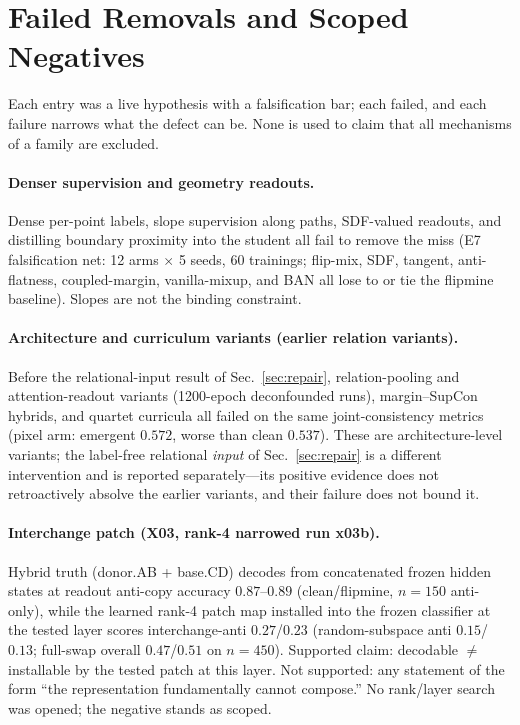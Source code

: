 \section{Failed Removals and Scoped Negatives}
\label{sec:failures}

Each entry was a live hypothesis with a falsification bar; each failed, and
each failure narrows what the defect can be. None is used to claim that all
mechanisms of a family are excluded.

\paragraph{Denser supervision and geometry readouts.} Dense per-point
labels, slope supervision along paths, SDF-valued readouts, and distilling
boundary proximity into the student all fail to remove the miss (E7
falsification net: 12 arms $\times$ 5 seeds, 60 trainings; flip-mix, SDF,
tangent, anti-flatness, coupled-margin, vanilla-mixup, and BAN all lose to
or tie the flipmine baseline). Slopes are not the binding constraint.

\paragraph{Architecture and curriculum variants (earlier relation
variants).} Before the relational-input result of
Sec.~\ref{sec:repair}, relation-pooling and attention-readout variants
(1200-epoch deconfounded runs), margin--SupCon hybrids, and quartet
curricula all failed on the same joint-consistency metrics (pixel arm:
emergent $0.572$, worse than clean $0.537$). These are architecture-level
variants; the label-free relational \emph{input} of
Sec.~\ref{sec:repair} is a different intervention and is reported
separately---its positive evidence does not retroactively absolve the
earlier variants, and their failure does not bound it.

\paragraph{Interchange patch (X03, rank-4 narrowed run x03b).} Hybrid
truth (donor.AB + base.CD) decodes from concatenated frozen hidden states
at readout anti-copy accuracy $0.87$--$0.89$ (clean/flipmine, $n{=}150$
anti-only), while the learned rank-4 patch map installed into the frozen
classifier at the tested layer scores interchange-anti $0.27$/$0.23$
(random-subspace anti $0.15$/$0.13$; full-swap overall $0.47$/$0.51$ on
$n{=}450$). Supported claim: decodable $\neq$ installable by the tested
patch at this layer. Not supported: any statement of the form ``the
representation fundamentally cannot compose.'' No rank/layer search was
opened; the negative stands as scoped.

